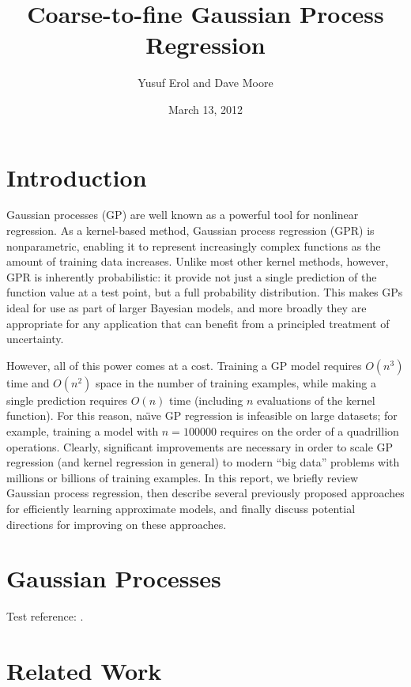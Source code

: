 \documentclass{article}
\begin{document}
\title{Coarse-to-fine Gaussian Process Regression}
\author{Yusuf Erol and Dave Moore}
\date{March 13, 2012}
\maketitle

\section{Introduction}

Gaussian processes (GP) are well known as a powerful tool for nonlinear regression. As a kernel-based method, Gaussian process regression (GPR) is nonparametric, enabling it to represent increasingly complex functions as the amount of training data increases. Unlike most other kernel methods, however, GPR is inherently probabilistic: it provide not just a single prediction of the function value at a test point, but a full probability distribution. This makes GPs ideal for use as part of larger Bayesian models, and more broadly they are appropriate for any application that can benefit from a principled treatment of uncertainty. 

However, all of this power comes at a cost. Training a GP model requires $O(n^3)$ time and $O(n^2)$ space in the number of training examples, while making a single prediction requires $O(n)$ time (including $n$ evaluations of the kernel function). For this reason, na\"{\i}ve GP regression is infeasible on large datasets; for example, training a model with $n = 100000$ requires on the order of a quadrillion operations. Clearly, significant improvements are necessary in order to scale GP regression (and kernel regression in general) to modern ``big data'' problems with millions or billions of training examples. In this report, we briefly review Gaussian process regression, then describe several previously proposed approaches for efficiently learning approximate models, and finally discuss potential directions for improving on these approaches. 

\section{Gaussian Processes}



Test reference: \cite{rasmussen06}. 

\section{Related Work}
\end{document}
